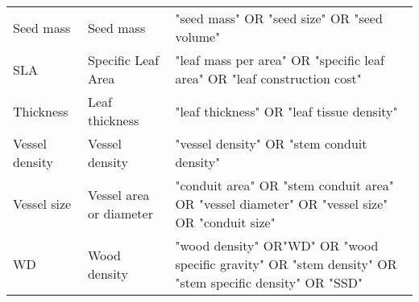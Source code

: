 \documentclass[a4paper]{article}\usepackage[]{graphicx}\usepackage[]{color}
\begin{document}
\begin{appendices}
\begin{table}[ht]
\begin{tabular}{p{3cm}p{3cm}p{8cm}}
  Seed mass & Seed mass & "seed mass" OR "seed size" OR "seed volume" \\
  SLA & Specific Leaf Area & "leaf mass per area" OR "specific leaf area" OR "leaf construction cost" \\
  Thickness & Leaf thickness & "leaf thickness"  OR "leaf tissue density" \\
  Vessel density & Vessel density & "vessel density" OR "stem conduit density" \\
  Vessel size & Vessel area or diameter & "conduit area" OR "stem conduit area" OR "vessel diameter" OR "vessel size" OR "conduit size"   \\
  WD & Wood density & "wood density" OR"WD" OR "wood specific gravity" OR "stem density" OR "stem specific density" OR "SSD" \\
   \hline
\end{tabular}
\end{table}



\end{appendices}
\end{document}
